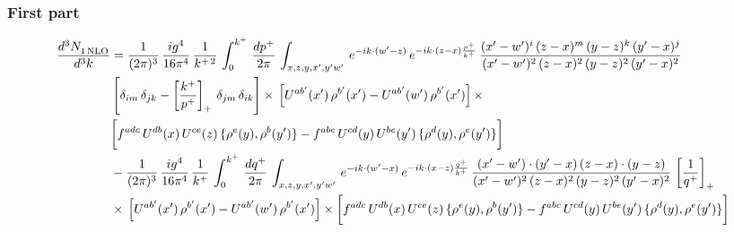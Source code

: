 \documentclass[9pt]{article}
\numberwithin{equation}{section}
\begin{document}
\subsubsection*{First part}
\begin{align}
     \frac{d^{3}N_{1\,\rm NLO}^{\rm}}{d^{3}k}  & =  \frac{1}{(2\pi)^{3}}\, \frac{ig^{4}}{16\pi^{4}}\, \frac{1}{k^{+\,2}}\,\int_{0}^{k^{+}}\, \frac{dp^{+}}{2\pi}\,\int_{x,z,y,x',y'w'}\,e^{-ik\cdot (w^\prime-z)}\,e^{-ik\cdot (z-x)\frac{p^{+}}{k^{+}}}\,\frac{(x'-w')^{i}\,(z-x)^{m}\,(y-z)^{k}\,(y'-x)^{j}}{(x'-w')^{2}\,(z-x)^{2}\,(y-z)^{2}\,(y'-x)^{2}}\,\notag \\ & \left[\delta_{im}\,\delta_{jk}-\left[\frac{k^{+}}{p^{+}}\right]_{+}\, \delta_{jm}\,\delta_{ik}\right]\times\, \left[U^{ab'}(x')\,\rho^{b'}(x')-U^{ab'}(w')\,\rho^{b'}(x')\right]\times\notag \\ & \bigg[f^{adc}\,U^{db}(x)\,U^{ce}(z)\, \{\rho^{e}(y),\rho^{b}(y')\}-f^{abc}\,U^{cd}(y)\,U^{be}(y')\, \{\rho^{d}(y),\rho^{e}(y')\}\bigg] \notag \\ & -\frac{1}{(2\pi)^{3}}\, \frac{ig^{4}}{16\pi^{4}}\, \frac{1}{k^{+}}\,\int_{0}^{k^{+}}\, \frac{dq^{+}}{2\pi}\,\int_{x,z,y,x',y'w'}\,e^{-ik\cdot (w^\prime-x)}\,e^{-ik\cdot (x-z)\frac{q^{+}}{k^{+}}}\,\frac{(x'-w')\cdot (y'-x)\,(z-x)\cdot (y-z)}{(x'-w')^{2}\,(z-x)^{2}\,(y-z)^{2}\,(y'-x)^{2}}\,\left[\frac{1}{q^{+}}\right]_{+}\notag \\ & \times\, \left[U^{ab'}(x')\,\rho^{b'}(x')-U^{ab'}(w')\,\rho^{b'}(x')\right]\times \bigg[f^{adc}\,U^{db}(x)\,U^{ce}(z)\, \{\rho^{e}(y),\rho^{b}(y')\}-f^{abc}\,U^{cd}(y)\,U^{be}(y')\, \{\rho^{d}(y),\rho^{e}(y')\}\bigg]
\end{align}
\end{document}
